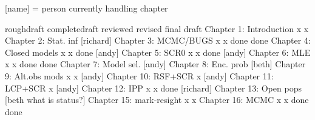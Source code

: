 [name] = person currently handling chapter


                          roughdraft   completedraft  reviewed  revised  final draft
Chapter 1: Introduction       x              x
Chapter 2: Stat. inf        [richard]
Chapter 3: MCMC/BUGS          x              x         done      done
Chapter 4: Closed models      x              x         done     [andy]
Chapter 5: SCR0               x              x         done     [andy]
Chapter 6: MLE                x              x         done      done
Chapter 7: Model sel.       [andy]
Chapter 8: Enc. prob        [beth]
Chapter 9: Alt.obs mods       x              x        [andy]
Chapter 10: RSF+SCR           x           [andy]
Chapter 11: LCP+SCR           x           [andy]
Chapter 12: IPP               x              x         done     [richard]
Chapter 13: Open pops       [beth what is status?]
Chapter 15: mark-resight      x              x        
Chapter 16: MCMC              x              x         done      done


